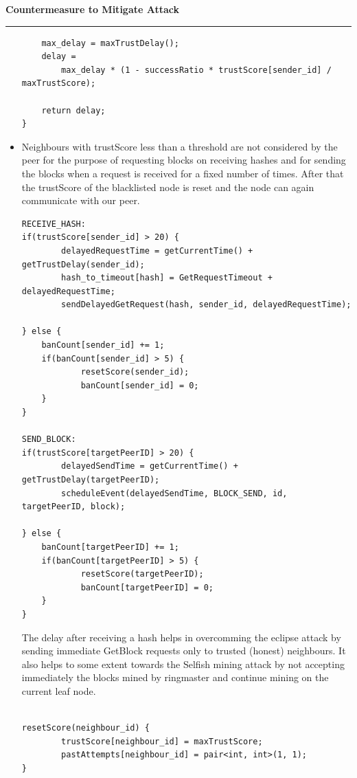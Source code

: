 \documentclass[a4paper,12pt]{article}
\newenvironment{solution}[2][]{%
\begin{mdframed}[linecolor=blue!70!black, linewidth=2pt, roundcorner=10pt, backgroundcolor=yellow!10!white, skipabove=12pt, skipbelow=12pt]%
	\textbf{\large #2}
	\par\noindent\rule{\textwidth}{0.4pt}
}{
\end{mdframed}
}
\begin{document}
\begin{solution}{Countermeasure to Mitigate Attack}
\begin{itemize}
\begin{mdframed}[linecolor=black, linewidth=2pt, roundcorner=10pt, backgroundcolor=yellow!10!white, skipabove=12pt, skipbelow=12pt]
\begin{verbatim}
	max_delay = maxTrustDelay();
	delay = 
		max_delay * (1 - successRatio * trustScore[sender_id] / maxTrustScore);
	
	return delay;
}
		\end{verbatim}
		\end{mdframed}
	
	\item Neighbours with trustScore less than a threshold are not considered by the peer for the purpose of requesting blocks on receiving hashes and for sending the blocks when a request is received for a fixed number of times. After that the trustScore of the blacklisted node is reset and the node can again communicate with our peer.
	\begin{mdframed}[linecolor=black, linewidth=2pt, roundcorner=10pt, backgroundcolor=yellow!10!white, skipabove=12pt, skipbelow=12pt]
		\begin{verbatim}
RECEIVE_HASH:
if(trustScore[sender_id] > 20) {
		delayedRequestTime = getCurrentTime() + getTrustDelay(sender_id);
		hash_to_timeout[hash] = GetRequestTimeout + delayedRequestTime;
		sendDelayedGetRequest(hash, sender_id, delayedRequestTime); 

} else {
	banCount[sender_id] += 1;
	if(banCount[sender_id] > 5) {
			resetScore(sender_id);
			banCount[sender_id] = 0;
	}
}

SEND_BLOCK:
if(trustScore[targetPeerID] > 20) {
		delayedSendTime = getCurrentTime() + getTrustDelay(targetPeerID);
		scheduleEvent(delayedSendTime, BLOCK_SEND, id, targetPeerID, block);

} else {
	banCount[targetPeerID] += 1;
	if(banCount[targetPeerID] > 5) {
			resetScore(targetPeerID);
			banCount[targetPeerID] = 0;
	}
}

\end{verbatim}
\end{mdframed}

The delay after receiving a hash helps in overcomming the eclipse attack by sending immediate GetBlock requests only to trusted (honest) neighbours. It also helps to some extent towards the Selfish mining attack by not accepting immediately the blocks mined by ringmaster and continue mining on the current leaf node.

\begin{mdframed}[linecolor=black, linewidth=2pt, roundcorner=10pt, backgroundcolor=yellow!10!white, skipabove=12pt, skipbelow=12pt]
	\begin{verbatim}

resetScore(neighbour_id) {
		trustScore[neighbour_id] = maxTrustScore;
		pastAttempts[neighbour_id] = pair<int, int>(1, 1);
}
	\end{verbatim}
	\end{mdframed}
\end{itemize}

\end{solution}
\end{document}
